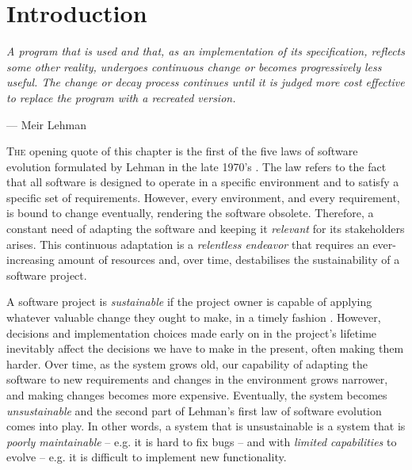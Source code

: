 \chapter{Introduction}\label{chap:introduction}

\epigraph{\emph{A program that is used and that, as an implementation of its specification, reflects some other reality, undergoes continuous change or becomes progressively less useful.
The change or decay process continues until it is judged more cost effective to replace the program with a recreated version.}}{--- Meir Lehman}

\lettrine{T}{he} opening quote of this chapter is the first of the five laws of software evolution formulated by Lehman in the late 1970's \cite{Lehman1979}.
The law refers to the fact that all software is designed to operate in a specific environment and to satisfy a specific set of requirements. 
However, every environment, and every requirement, is bound to change eventually, rendering the software obsolete. %
Therefore, a constant need of adapting the software and keeping it \emph{relevant} for its stakeholders arises.
This continuous adaptation is a \emph{relentless endeavor} that requires an ever-increasing amount of resources and, over time, destabilises the sustainability of a software project.

A software project is \emph{sustainable} if the project owner is capable of applying whatever valuable change they ought to make, in a timely fashion \cite{Winters2020}.
However, decisions and implementation choices made early on in the project's lifetime inevitably affect the decisions we have to make in the present, often making them harder.
Over time, as the system grows old, our capability of adapting the software to new requirements and changes in the environment grows narrower, and making changes becomes more expensive.
Eventually, the system becomes \emph{unsustainable} and the second part of Lehman's first law of software evolution comes into play.
In other words, a system that is unsustainable is a system that is \emph{poorly maintainable} -- e.g. it is hard to fix bugs -- and with \emph{limited capabilities} to evolve -- e.g. it is difficult to implement new functionality. 

